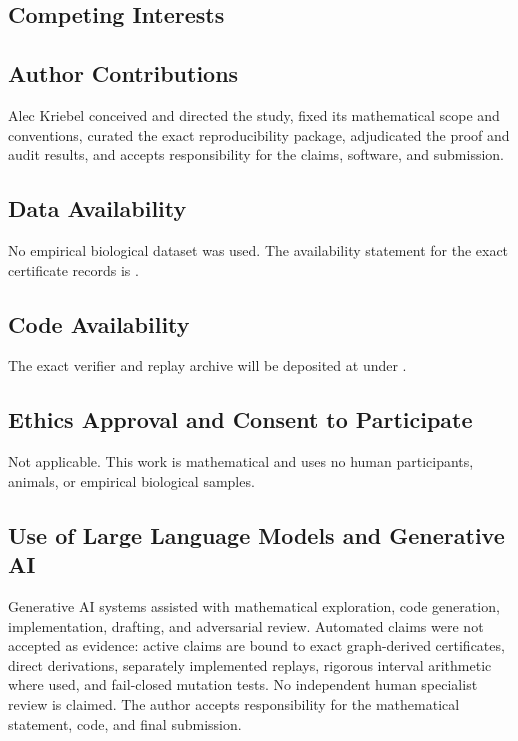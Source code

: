 \documentclass[11pt]{article}
\providecommand{\KThreePCanonicalRoot}{manuscript}
\begin{document}
\subsection*{Competing Interests}
\texttt{}

\subsection*{Author Contributions}
Alec Kriebel conceived and directed the study, fixed its mathematical scope
and conventions, curated the exact reproducibility package, adjudicated the
proof and audit results, and accepts responsibility for the claims, software,
and submission.

\subsection*{Data Availability}
No empirical biological dataset was used. The availability statement for the
exact certificate records is
\texttt{}.

\subsection*{Code Availability}
The exact verifier and replay archive will be deposited at
\texttt{} under
\texttt{}.

\subsection*{Ethics Approval and Consent to Participate}
Not applicable. This work is mathematical and uses no human participants,
animals, or empirical biological samples.

\subsection*{Use of Large Language Models and Generative AI}
Generative AI systems assisted with mathematical exploration, code
generation, implementation, drafting, and adversarial review. Automated
claims were not accepted as evidence: active claims are bound to exact
graph-derived certificates, direct derivations, separately implemented
replays, rigorous interval arithmetic where used, and fail-closed mutation
tests. No independent human specialist review is claimed. The author accepts
responsibility for the mathematical statement, code, and final submission.

{\small
\raggedright


}
\end{document}
